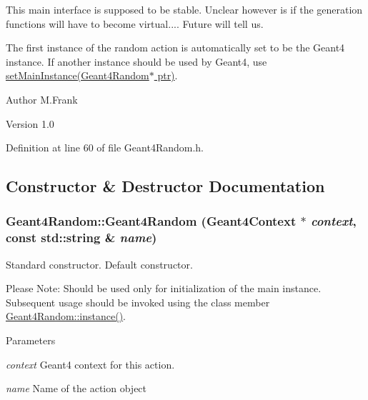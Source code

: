 This main interface is supposed to be stable. Unclear however is if the generation functions will have to become virtual.... Future will tell us.

The first instance of the random action is automatically set to be the Geant4 instance. If another instance should be used by Geant4, use \hyperlink{class_d_d4hep_1_1_simulation_1_1_geant4_random_a544fa42f6ae0d64697e366da5e1297b2}{setMainInstance(Geant4Random$\ast$ ptr)}.

\begin{DoxyAuthor}{Author}
M.Frank 
\end{DoxyAuthor}
\begin{DoxyVersion}{Version}
1.0 
\end{DoxyVersion}


Definition at line 60 of file Geant4Random.h.

\subsection{Constructor \& Destructor Documentation}
\hypertarget{class_d_d4hep_1_1_simulation_1_1_geant4_random_a44e88e26d5ae30b269b81c6d2dfc6511}{
\subsubsection[{Geant4Random}]{\setlength{\rightskip}{0pt plus 5cm}Geant4Random::Geant4Random ({\bf Geant4Context} $\ast$ {\em context}, \/  const std::string \& {\em name})}}
\label{class_d_d4hep_1_1_simulation_1_1_geant4_random_a44e88e26d5ae30b269b81c6d2dfc6511}


Standard constructor. Default constructor.

Please Note: Should be used only for initialization of the main instance. Subsequent usage should be invoked using the class member \hyperlink{class_d_d4hep_1_1_simulation_1_1_geant4_random_a76e4bbadf0c58d9f6ee05decdd200fe6}{Geant4Random::instance()}.


\begin{DoxyParams}{Parameters}
\item[{\em context}]Geant4 context for this action. \item[{\em name}]Name of the action object \end{DoxyParams}



